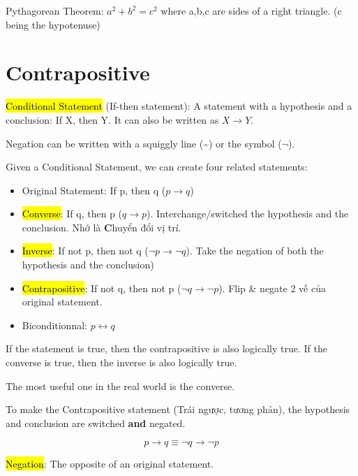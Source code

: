Pythagorean Theorem: $a^{2}+b^{2}=c^{2}$ where a,b,c are sides of a right triangle. (c being the hypotenuse)

\section{Contrapositive}

\hl{Conditional Statement} (If-then statement): A statement with a hypothesis and a conclusion: If X, then Y. It can also be written as $X \rightarrow Y$.

Negation can be written with a squiggly line (\textasciitilde) or the symbol ($\neg$).

\vspace{.4cm}

Given a Conditional Statement, we can create four related statements:

\begin{itemize}
  \item Original Statement: If p, then q ($p \rightarrow q$)
  \item \hl{Converse}: If q, then p ($q \rightarrow p$). Interchange/switched the hypothesis and the conclusion. Nhớ  là \textbf{C}huyển đổi vị trí.
  \item \hl{Inverse}: If not p, then not q ($\neg p \rightarrow \neg q$). Take the negation of both the hypothesis and the conclusion)
  \item \hl{Contrapositive}: If not q, then not p ($\neg q \rightarrow \neg p$). Flip \& negate 2 vế của original statement.
  \item Biconditionnal: $p \longleftrightarrow q$
\end{itemize}

If the statement is true, then the contrapositive is also logically true. If the converse is true, then the inverse is also logically true.

The most useful one in the real world is the converse.

\vspace{0.5cm}

To make the Contrapositive statement (Trái ngược, tương phản), the hypothesis and conclusion are switched \textbf{and} negated.

\[p \rightarrow q \equiv \neg q \rightarrow \neg p\]

\vspace{0.5cm}

\hl{Negation}: The opposite of an original statement.

